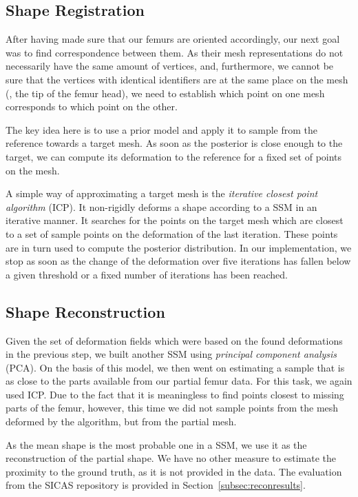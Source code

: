 
\subsection{Shape Registration}
\label{subsec:registr}

After having made sure that our femurs are oriented accordingly, our next goal was to find correspondence between them.
As their mesh representations do not necessarily have the same amount of vertices, and, furthermore, we cannot be sure that the vertices with identical identifiers are at the same place on the mesh (\eg, the tip of the femur head), we need to establish which point on one mesh corresponds to which point on the other.

The key idea here is to use a prior model and apply it to sample from the reference towards a target mesh.
As soon as the posterior is close enough to the target, we can compute its deformation to the reference for a fixed set of points on the mesh.

A simple way of approximating a target mesh is the \emph{iterative closest point algorithm} (ICP).
It non-rigidly deforms a shape according to a SSM in an iterative manner.
It searches for the points on the target mesh which are closest to a set of sample points on the deformation of the last iteration.
These points are in turn used to compute the posterior distribution.
In our implementation, we stop as soon as the change of the deformation over five iterations has fallen below a given threshold or a fixed number of iterations has been reached.


\subsection{Shape Reconstruction}
\label{subsec:recon}

Given the set of deformation fields which were based on the found deformations in the previous step, we built another SSM using \emph{principal component analysis} (PCA).
On the basis of this model, we then went on estimating a sample that is as close to the parts available from our partial femur data.
For this task, we again used ICP.
Due to the fact that it is meaningless to find points closest to missing parts of the femur, however, this time we did not sample points from the mesh deformed by the algorithm, but from the partial mesh.

As the mean shape is the most probable one in a SSM, we use it as the reconstruction of the partial shape.
We have no other measure to estimate the proximity to the ground truth, as it is not provided in the data.
The evaluation from the SICAS repository is provided in Section~\ref{subsec:reconresults}.
